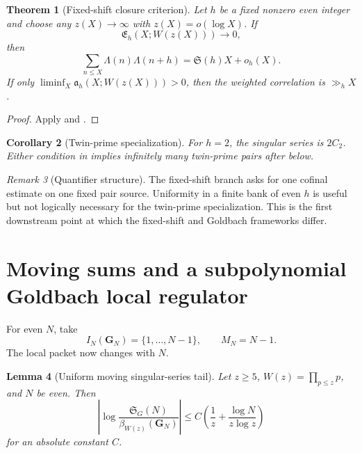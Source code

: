 \documentclass[11pt]{article}
\newtheorem{theorem}{Theorem}[section]
\newtheorem{lemma}[theorem]{Lemma}
\newtheorem{corollary}[theorem]{Corollary}
\theoremstyle{definition}
\theoremstyle{remark}
\newtheorem{remark}[theorem]{Remark}
\begin{document}
\begin{theorem}[Fixed-shift closure criterion]
\label{thm:shift-closure}
Let $h$ be a fixed nonzero even integer and choose any
$z(X)\to\infty$ with $z(X)=o(\log X)$.  If
\[
 \boxed{\mathfrak E_h(X;W(z(X)))\to0,}
 \tag{11.3}
\]
then
\[
 \boxed{
 \sum_{n\le X}\Lambda(n)\Lambda(n+h)
 =\mathfrak S(h)X+o_h(X).}
 \tag{11.4}
\]
If only
$\liminf_X\mathfrak a_h(X;W(z(X)))>0$, then the weighted correlation is
$\gg_hX$.
\end{theorem}

\begin{proof}
Apply  and
.
\end{proof}

\begin{corollary}[Twin-prime specialization]
\label{cor:twin-specialization}
For $h=2$, the singular series is $2C_2$.  Either condition in
 implies infinitely many twin-prime pairs after
 below.
\end{corollary}

\begin{remark}[Quantifier structure]
The fixed-shift branch asks for one cofinal estimate on one fixed pair source.
Uniformity in a finite bank of even $h$ is useful but not logically necessary
for the twin-prime specialization.  This is the first downstream point at
which the fixed-shift and Goldbach frameworks differ.
\end{remark}

\section{Moving sums and a subpolynomial Goldbach local regulator}
\label{sec:Goldbach}

For even $N$, take
\[
 I_N(\bm G_N)=\{1,\ldots,N-1\},
 \qquad M_N=N-1.
 \tag{12.1}
\]
The local packet now changes with $N$.

\begin{lemma}[Uniform moving singular-series tail]
\label{lem:Goldbach-tail}
Let $z\ge5$, $W(z)=\prod_{p\le z}p$, and $N$ be even.  Then
\[
 \boxed{
 \left|\log\frac{\mathfrak S_G(N)}{\beta_{W(z)}(\bm G_N)}\right|
 \le C\left(\frac1z+
 \frac{\log N}{z\log z}\right)}
 \tag{12.2}
\]
for an absolute constant $C$.
\end{lemma}
\end{document}
